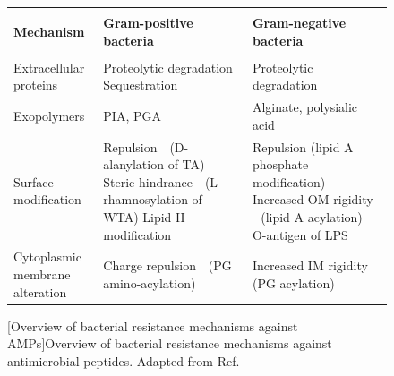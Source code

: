 \begin{figure}[h]
\footnotesize
\vspace{0.5cm}
\centering
 \def\arraystretch{1.1}
\begin{tabular}{lll}
\hline \\
\textbf{Mechanism} & \textbf{Gram-positive bacteria} & \textbf{Gram-negative bacteria} \vspace{0.3cm}\\
 \hline \\
Extracellular proteins & \specialcell[t]{Proteolytic degradation\\Sequestration} &  Proteolytic degradation \vspace{0.35cm} \\
Exopolymers & PIA, PGA & Alginate, polysialic acid \vspace{0.35cm} \\
Surface modification & \specialcell[t]{Repulsion\\$\ \ \ $(D-alanylation of TA)\\Steric hindrance \\$\ \ \ $(L-rhamnosylation of WTA)\\Lipid II modification} & \specialcell[t]{Repulsion (lipid A\\$\ \ \ $phosphate modification)\\Increased OM rigidity \\$\ \ \ $(lipid A acylation)\\O-antigen of LPS} \vspace{0.35cm} \\
\specialcell[t]{Cytoplasmic membrane\\alteration} & \specialcell[t]{Charge repulsion \\$\ \ \ $(PG amino-acylation)} & \specialcell[t]{Increased IM rigidity\\$\ \ \ $(PG acylation)} \vspace{0.3cm} \\
\hline
 \end{tabular}
[Overview of bacterial resistance mechanisms against AMPs]{Overview of bacterial resistance mechanisms against antimicrobial peptides. Adapted from Ref. \cite{Joo2016}}
\label{table:AMP_res}
\end{figure}

